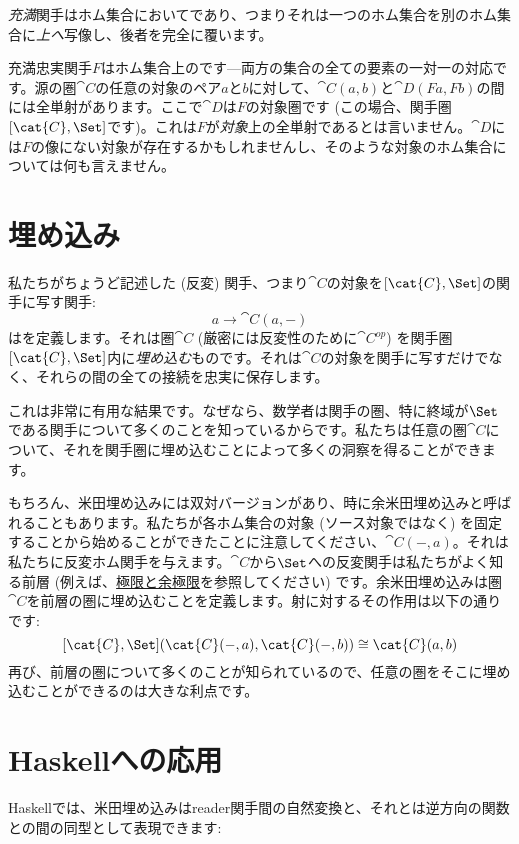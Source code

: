 \emph{充満}関手はホム集合においてであり、つまりそれは一つのホム集合を別のホム集合に\emph{上へ}写像し、後者を完全に覆います。

充満忠実関手$F$はホム集合上のです---両方の集合の全ての要素の一対一の対応です。源の圏$\cat{C}$の任意の対象のペア$a$と$b$に対して、$\cat{C}(a, b)$と$\cat{D}(F a, F b)$の間には全単射があります。ここで$\cat{D}$は$F$の対象圏です (この場合、関手圏$[\cat{C}, \Set]$です)。これは$F$が\emph{対象}上の全単射であるとは言いません。$\cat{D}$には$F$の像にない対象が存在するかもしれませんし、そのような対象のホム集合については何も言えません。

\section{埋め込み}

私たちがちょうど記述した (反変) 関手、つまり$\cat{C}$の対象を$[\cat{C}, \Set]$の関手に写す関手: 
\[a \to \cat{C}(a, -)\]
はを定義します。それは圏$\cat{C}$ (厳密には反変性のために$\cat{C}^\mathit{op}$) を関手圏$[\cat{C}, \Set]$内に\emph{埋め込む}ものです。それは$\cat{C}$の対象を関手に写すだけでなく、それらの間の全ての接続を忠実に保存します。

これは非常に有用な結果です。なぜなら、数学者は関手の圏、特に終域が$\Set$である関手について多くのことを知っているからです。私たちは任意の圏$\cat{C}$について、それを関手圏に埋め込むことによって多くの洞察を得ることができます。

もちろん、米田埋め込みには双対バージョンがあり、時に余米田埋め込みと呼ばれることもあります。私たちが各ホム集合の対象 (ソース対象ではなく) を固定することから始めることができたことに注意してください、$\cat{C}(-, a)$。それは私たちに反変ホム関手を与えます。$\cat{C}$から$\Set$への反変関手は私たちがよく知る前層 (例えば、\hyperref[limits-and-colimits]{極限と余極限}を参照してください) です。余米田埋め込みは圏$\cat{C}$を前層の圏に埋め込むことを定義します。射に対するその作用は以下の通りです: 
\[[\cat{C}, \Set](\cat{C}(-, a), \cat{C}(-, b)) \cong \cat{C}(a, b)\]
再び、前層の圏について多くのことが知られているので、任意の圏をそこに埋め込むことができるのは大きな利点です。

\section{Haskellへの応用}

Haskellでは、米田埋め込みはreader関手間の自然変換と、それとは逆方向の関数との間の同型として表現できます: 

